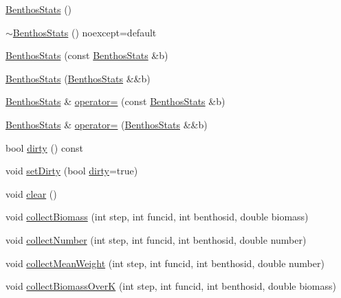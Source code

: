 \begin{DoxyCompactItemize}
\item 
\mbox{\hyperlink{class_benthos_stats_a47e02340d02e7e47c02a1677e70354c0}{Benthos\+Stats}} ()
\item 
\mbox{\hyperlink{class_benthos_stats_a301d4ed0b15fe6cfe6e245fd5d8571d8}{$\sim$\+Benthos\+Stats}} () noexcept=default
\item 
\mbox{\hyperlink{class_benthos_stats_ab0f1fb107c1395218f8702e9de604b70}{Benthos\+Stats}} (const \mbox{\hyperlink{class_benthos_stats}{Benthos\+Stats}} \&b)
\item 
\mbox{\hyperlink{class_benthos_stats_a88540002ee6bb0a84568f6f26b700e00}{Benthos\+Stats}} (\mbox{\hyperlink{class_benthos_stats}{Benthos\+Stats}} \&\&b)
\item 
\mbox{\hyperlink{class_benthos_stats}{Benthos\+Stats}} \& \mbox{\hyperlink{class_benthos_stats_acdd32354484c647275136b0fd036208d}{operator=}} (const \mbox{\hyperlink{class_benthos_stats}{Benthos\+Stats}} \&b)
\item 
\mbox{\hyperlink{class_benthos_stats}{Benthos\+Stats}} \& \mbox{\hyperlink{class_benthos_stats_a2230b3cfc41b345a2c1db7dc15ae10a9}{operator=}} (\mbox{\hyperlink{class_benthos_stats}{Benthos\+Stats}} \&\&b)
\item 
bool \mbox{\hyperlink{class_benthos_stats_a875f7528f92e7d28e0c4f48891ce1692}{dirty}} () const
\item 
void \mbox{\hyperlink{class_benthos_stats_a161035c4fb649cdd90d665af951d1462}{set\+Dirty}} (bool \mbox{\hyperlink{class_benthos_stats_a875f7528f92e7d28e0c4f48891ce1692}{dirty}}=true)
\item 
void \mbox{\hyperlink{class_benthos_stats_a81929a803ffce20c9cf77210de95c8d1}{clear}} ()
\item 
void \mbox{\hyperlink{class_benthos_stats_a05005c7a2b7566175dc0b9004a0fbedd}{collect\+Biomass}} (int step, int funcid, int benthosid, double biomass)
\item 
void \mbox{\hyperlink{class_benthos_stats_aad2a3c2de311f528b1e16bdf26effc2f}{collect\+Number}} (int step, int funcid, int benthosid, double number)
\item 
void \mbox{\hyperlink{class_benthos_stats_a9497fe6d6e3ef99a32803fc4c27ba15f}{collect\+Mean\+Weight}} (int step, int funcid, int benthosid, double number)
\item 
void \mbox{\hyperlink{class_benthos_stats_a370a3d1729f3eaa15f4c491df15479e6}{collect\+Biomass\+OverK}} (int step, int funcid, int benthosid, double biomass)
\item 

\end{DoxyCompactItemize}
